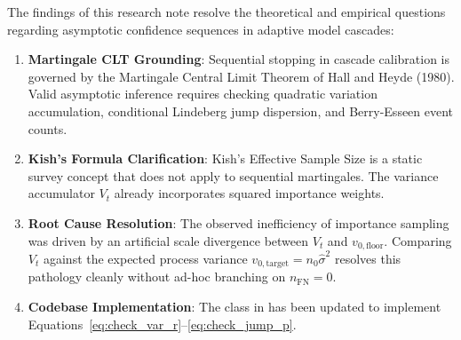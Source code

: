 \documentclass[11pt,a4paper]{article}
\begin{document}
The findings of this research note resolve the theoretical and empirical questions regarding asymptotic confidence sequences in adaptive model cascades:
\begin{enumerate}[leftmargin=*]
    \item \textbf{Martingale CLT Grounding}: Sequential stopping in cascade calibration is governed by the Martingale Central Limit Theorem of Hall and Heyde (1980). Valid asymptotic inference requires checking quadratic variation accumulation, conditional Lindeberg jump dispersion, and Berry-Esseen event counts.
    \item \textbf{Kish's Formula Clarification}: Kish's Effective Sample Size is a static survey concept that does not apply to sequential martingales. The variance accumulator $V_t$ already incorporates squared importance weights.
    \item \textbf{Root Cause Resolution}: The observed inefficiency of importance sampling was driven by an artificial scale divergence between $V_t$ and $v_{0, \text{floor}}$. Comparing $V_t$ against the expected process variance $v_{0, \text{target}} = n_0 \hat{\sigma}^2$ resolves this pathology cleanly without ad-hoc branching on $n_{\text{FN}} = 0$.
    \item \textbf{Codebase Implementation}: The  class in  has been updated to implement Equations~\eqref{eq:check_var_r}--\eqref{eq:check_jump_p}.
\end{enumerate}
\end{document}
